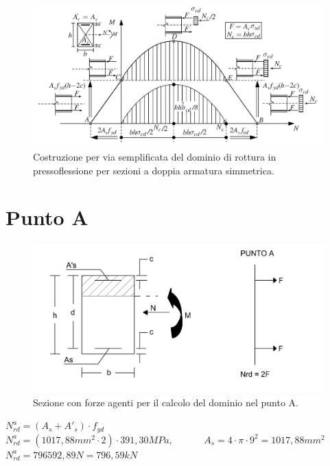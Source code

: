 \documentclass[a4paper,12pt, oneside]{book}
\begin{document}
    \begin{figure}[H]
    	\centering
    	\includegraphics[width=0.7\linewidth]{"immagini/dominio tipo"}
    	\caption{Costruzione per via semplificata del dominio di rottura in pressoflessione per sezioni a doppia armatura simmetrica.}
    	\label{fig:dominio-tipo}
    \end{figure}
    
    \section{Punto A}

    \begin{figure}[H]
    	\centering
    	\includegraphics[width=0.7\linewidth]{"immagini/dominio A"}
    	\caption{Sezione con forze agenti per il calcolo del dominio nel punto A.}
    	\label{fig:dominio-a}
    \end{figure}
    
    $N_{rd}^{a}=(A_s+A'_s)\cdot f_{yd}$
    \leavevmode\newline
    \leavevmode\newline
    $N_{rd}^{a}=(1017,88mm^2\cdot 2)\cdot 391,30MPa,\phantom{aaaaaa}  A_s=4\cdot\pi\cdot 9^2=1017,88mm^2$
    \leavevmode\newline
    \leavevmode\newline
    $N_{rd}^{a}=796592,89N=796,59kN$
    
\end{document}
